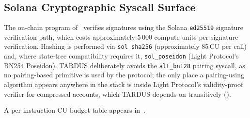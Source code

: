 \subsection{Solana Cryptographic Syscall Surface}
\label{sec:syscalls}

The on-chain program of~ verifies signatures using the Solana \texttt{ed25519} signature verification path, which costs approximately 5\,000 compute units per signature verification. Hashing is performed via \texttt{sol\_sha256} (approximately 85\,CU per call) and, where state-tree compatibility requires it, \texttt{sol\_poseidon} (Light Protocol's BN254 Poseidon). TARDUS deliberately avoids the \texttt{alt\_bn128} pairing syscall, as no pairing-based primitive is used by the protocol; the only place a pairing-using algorithm appears anywhere in the stack is inside Light Protocol's validity-proof verifier for compressed accounts, which TARDUS depends on transitively ().

A per-instruction CU budget table appears in~.
